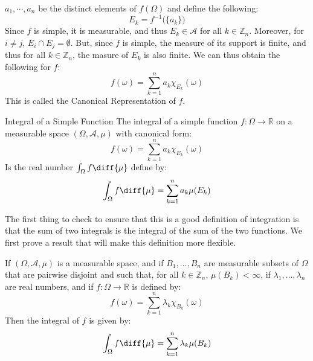     $a_{1},\cdots,a_{n}$ be the distinct elements of
    $f(\Omega)$ and define the following:
    \begin{equation}
        E_{k}=f^{-1}\big(\{a_{k}\}\big)
    \end{equation}
    Since $f$ is simple, it is measurable, and thus
    $E_{k}\in\mathcal{A}$ for all $k\in\mathbb{Z}_{n}$.
    Moreover, for $i\ne{j}$,
    $E_{i}\cap{E}_{j}=\emptyset$. But, since $f$ is
    simple, the measure of its support is finite, and
    thus for all $k\in\mathbb{Z}_{n}$,
    the masure of $E_{k}$ is also finite.
    We can thus obtain the following for $f$:
    \begin{equation}
        f(\omega)=
            \sum_{k=1}^{n}a_{k}\chi_{E_{k}}(\omega)
    \end{equation}
    This is called the \textrm{Canonical Representation}
    of $f$.
    \begin{ldefinition}{Integral of a Simple Function}
        The integral of a simple function
        $f:\Omega\rightarrow\mathbb{R}$ on a measurable
        space $(\Omega,\mathcal{A},\mu)$ with canonical
        form:
        \begin{equation}
            f(\omega)=\sum_{k=1}^{n}
                a_{k}\chi_{E_{k}}(\omega)
        \end{equation}
        Is the real number $\int_{\Omega}f\diff{\mu}$
        define by:
        \begin{equation}
            \int_{\Omega}f\diff{\mu}=
                \sum_{k=1}^{n}a_{k}\mu(E_{k})
        \end{equation}
    \end{ldefinition}
    The first thing to check to ensure that this is
    a good definition of integration is that the
    sum of two integrals is the integral of the sum
    of the two functions. We first prove a result that
    will make this definition more flexible.
    \begin{theorem}
        If $(\Omega,\mathcal{A},\mu)$ is a measurable
        space, and if $B_{1},\dots,B_{n}$ are measurable
        subsets of $\Omega$ that are pairwise disjoint
        and such that, for all $k\in\mathbb{Z}_{n}$,
        $\mu(B_{k})<\infty$, if
        $\lambda_{1},\dots,\lambda_{n}$ are real
        numbers, and if $f:\Omega\rightarrow\mathbb{R}$
        is defined by:
        \begin{equation}
            f(\omega)=\sum_{k=1}^{n}
                \lambda_{k}\chi_{B_{k}}(\omega)
        \end{equation}
        Then the integral of $f$ is given by:
        \begin{equation}
            \int_{\Omega}f\diff{\mu}
                =\sum_{k=1}^{n}\lambda_{k}
                \mu(B_{k})
        \end{equation}
    \end{theorem}
